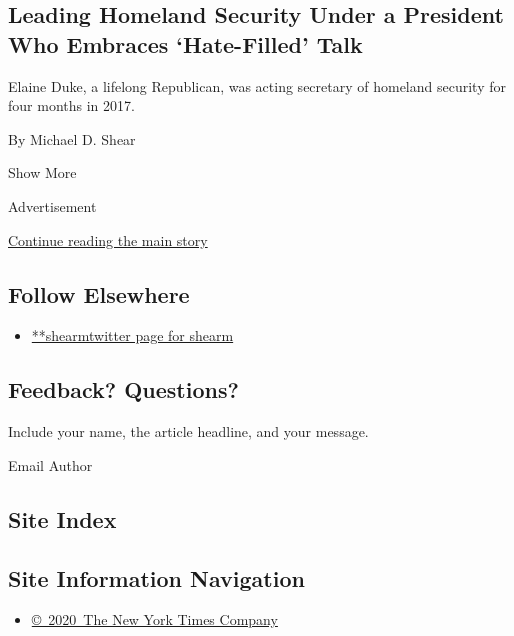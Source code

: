 \begin{enumerate}
  \hypertarget{leading-homeland-security-under-a-president-who-embraces-hate-filled-talk}{%
  \subsection{Leading Homeland Security Under a President Who Embraces
  `Hate-Filled'
  Talk}\label{leading-homeland-security-under-a-president-who-embraces-hate-filled-talk}}

  Elaine Duke, a lifelong Republican, was acting secretary of homeland
  security for four months in 2017.

  By Michael D. Shear
\end{enumerate}

Show More

Advertisement

\protect\hyperlink{after-mid2}{Continue reading the main story}

\hypertarget{follow-elsewhere}{%
\subsection{Follow Elsewhere}\label{follow-elsewhere}}

\begin{itemize}
\tightlist
\item
  \href{https://twitter.com/shearm}{**shearmtwitter page for shearm}
\end{itemize}

\hypertarget{feedback-questions}{%
\subsection{Feedback? Questions?}\label{feedback-questions}}

Include your name, the article headline, and your message.

Email Author

\hypertarget{site-index}{%
\subsection{Site Index}\label{site-index}}

\hypertarget{site-information-navigation}{%
\subsection{Site Information
Navigation}\label{site-information-navigation}}

\begin{itemize}
\tightlist
\item
  \href{https://help.nytimes3xbfgragh.onion/hc/en-us/articles/115014792127-Copyright-notice}{©~2020~The
  New York Times Company}
\end{itemize}

